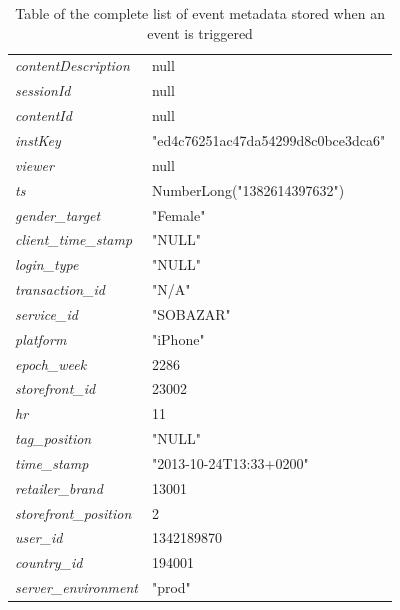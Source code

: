 \begin{table}[H]
{\begin{tabular}{l|l}
              \emph{contentDescription}    &   null     \\
              \emph{sessionId} &   null     \\
              \emph{contentId} &   null     \\
              \emph{instKey}   &   "ed4c76251ac47da54299d8c0bce3dca6"   \\
              \emph{viewer}    &   null     \\
              \emph{ts}    &   NumberLong("1382614397632")  \\
              \emph{gender\_target} &   "Female"     \\
              \emph{client\_time\_stamp} &   "NULL"   \\
              \emph{login\_type}    &   "NULL"   \\
              \emph{transaction\_id}    &   "N/A"    \\
              \emph{service\_id}    &   "SOBAZAR"    \\
              \emph{platform}  &   "iPhone"     \\
              \emph{epoch\_week}    &   2286     \\
              \emph{storefront\_id} &   23002    \\
              \emph{hr}    &   11   \\
              \emph{tag\_position}  &   "NULL"   \\
              \emph{time\_stamp}    &   "2013-10-24T13:33+0200"  \\
              \emph{retailer\_brand}    &   13001    \\
              \emph{storefront\_position}   &   2    \\
              \emph{user\_id}   &   1342189870   \\
              \emph{country\_id}    &   194001   \\
              \emph{server\_environment}    &   "prod" \\
              \bottomrule
          \end{tabular}
        }
        \caption[Complete List of Event Metadata]{Table of the complete list of event metadata stored when an event is triggered}
        \label{table:completeEventData}
    \end{table}

